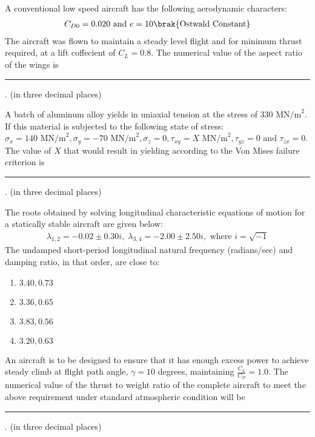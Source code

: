 \iffalse
\chapter{2017}
\author{EE24BTECH11015 - Dhawal}
\section{ae}
\fi
\item A conventional low speed aircraft has the following aerodynamic characters:
\begin{align*}
    C_{D0}=0.020 \text{ and } e=10\brak{\text{Ostwald Constant}}
\end{align*}
The aircraft was flown to maintain a steady level flight and for minimum thrust required, at a lift coffecient of $C_L=0.8$. The numerical value of the aspect ratio of the wings is \rule{1cm}{0.4 pt} . (in three decimal places)

\item A batch of aluminum alloy yields in uniaxial tension at the stress of $330  \text{ MN/m}^2$. If this material is subjected to the following state of stress: $\sigma_x = 140  \text{ MN/m}^2, \sigma_y = -70  \text{ MN/m}^2, \sigma_z = 0,  \tau_{xy} = X \text{ MN/m}^2, \tau_{yz} = 0 \text{ and } \tau_{zx} = 0$. The value of $X$ that would result in yielding according to the Von Mises failure criterion is \rule{1cm}{0.4 pt} . (in three decimal places)

\item The roots obtained by solving longitudinal characteristic equations of motion for a statically stable aircraft are given below:
\begin{align*}
    \lambda_{1,2} = -0.02 \pm 0.30i, \; \lambda_{3,4} = -2.00 \pm 2.50i, \text{ where } i = \sqrt{-1} 
\end{align*} 
The undamped short-period longitudinal natural frequency (radians/sec) and damping ratio, in that order, are close to:
\begin{multicols}{4}
\begin{enumerate}
\item $3.40, 0.73$
\item  $3.36, 0.65$
\item  $3.83, 0.56$
\item  $3.20, 0.63$
\end{enumerate}
\end{multicols}

\item An aircraft is to be designed to ensure that it has enough excess power to achieve steady climb at flight path angle, $\gamma = 10$ degrees, maintaining $\frac{C_L}{C_D} = 1.0$. The numerical value of the thrust to weight ratio of the complete aircraft to meet the above requirement under standard atmospheric condition will be \rule{1cm}{0.4 pt} . (in three decimal places)

